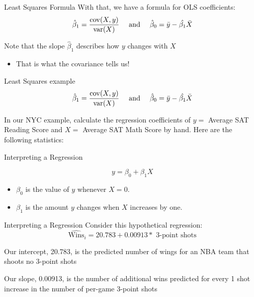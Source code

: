 \documentclass[aspectratio=169,t,11pt,table]{beamer}
\begin{document}
\begin{frame}{Least Squares Formula}
  With that, we have a formula for OLS coefficients:
  $$
    \hat{\beta}_1 = \frac{\cov(X, y)}{\var(X)} \quad\text{ and }\quad \hat{\beta}_0 = \bar{y} - \hat{\beta_1} \bar{X}
  $$

  \pause
  \bigskip
  Note that the slope $\hat{\beta}_1$ describes how $y$ changes with $X$
  \begin{itemize}
    \item That is what the covariance tells us!
  \end{itemize}
\end{frame}

\begin{frame}{Least Squares example}
  \vspace*{-\bigskipamount}
  $$
    \hat{\beta}_1 = \frac{\cov(X, y)}{\var(X)} \quad\text{ and }\quad \hat{\beta}_0 = \bar{y} - \hat{\beta_1} \bar{X}
  $$

  In our NYC example, calculate the regression coefficients of $y = $ Average SAT Reading Score and $X = $ Average SAT Math Score by hand. Here are the following statistics:
  
  

  \pause
\end{frame}

\begin{frame}{Interpreting a Regression}

  $$
  y = \beta_0 + \beta_1 X
  $$

  \begin{itemize}
    \item $\beta_0$ is the value of $y$ whenever $X = 0$.
    
    \item $\beta_1$ is the amount $y$ changes when $X$ increases by one.
  \end{itemize}
\end{frame}

\begin{frame}{Interpreting a Regression}
  Consider this hypothetical regression:
  $$
    \hat{\text{Wins}}_i = 20.783 + 0.00913 * \text{ 3-point shots}
  $$
  
  \bigskip
  Our intercept, 20.783, is the predicted number of wings for an NBA team that shoots no 3-point shots
  
  \pause
  \bigskip
  Our slope, 0.00913, is the number of additional wins predicted for every 1 shot increase in the number of per-game 3-point shots
\end{frame}
\end{document}
